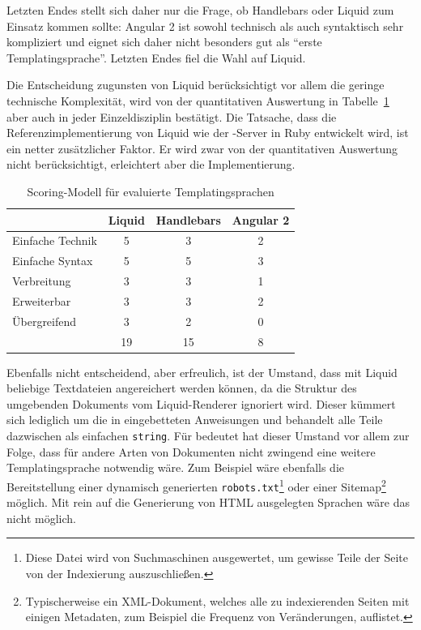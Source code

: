 Letzten Endes stellt sich daher nur die Frage, ob Handlebars oder Liquid zum Einsatz kommen sollte: Angular 2 ist sowohl technisch als auch syntaktisch sehr kompliziert und eignet sich daher nicht besonders gut als "`erste Templatingsprache"'. Letzten Endes fiel die Wahl auf Liquid.

Die Entscheidung zugunsten von Liquid berücksichtigt vor allem die geringe technische Komplexität, wird von der quantitativen Auswertung in Tabelle~\ref{tab:scoring-templating-language} aber auch in jeder Einzeldisziplin bestätigt. Die Tatsache, dass die Referenzimplementierung von Liquid wie der \idename{}-Server in Ruby entwickelt wird, ist ein netter zusätzlicher Faktor. Er wird zwar von der quantitativen Auswertung nicht berücksichtigt, erleichtert aber die Implementierung.

\begin{table}[h]
  \centering
  \begin{tabular}{ l c c c }
                      & Liquid   & Handlebars      & Angular 2   \\
    \hline
    Einfache Technik  & 5        & 3               & 2           \\
    Einfache Syntax   & 5        & 5               & 3           \\
    Verbreitung       & 3        & 3               & 1           \\
    Erweiterbar       & 3        & 3               & 2           \\
    Übergreifend      & 3        & 2               & 0           \\
    \hline \hline
                      & 19       & 15              & 8
  \end{tabular}
  \caption{Scoring-Modell für evaluierte Templatingsprachen}
  \label{tab:scoring-templating-language}
\end{table}

Ebenfalls nicht entscheidend, aber erfreulich, ist der Umstand, dass mit Liquid beliebige Textdateien angereichert werden können, da die Struktur des umgebenden Dokuments vom Liquid-Renderer ignoriert wird. Dieser kümmert sich lediglich um die in eingebetteten Anweisungen und behandelt alle Teile dazwischen als einfachen \texttt{string}. Für \idename{} bedeutet hat dieser Umstand vor allem zur Folge, dass für andere Arten von Dokumenten nicht zwingend eine weitere Templatingsprache notwendig wäre. Zum Beispiel wäre ebenfalls die Bereitstellung einer dynamisch generierten \texttt{robots.txt}\footnote{Diese Datei wird von Suchmaschinen ausgewertet, um gewisse Teile der Seite von der Indexierung auszuschließen.} oder einer Sitemap\footnote{Typischerweise ein XML-Dokument, welches alle zu indexierenden Seiten mit einigen Metadaten, zum Beispiel die Frequenz von Veränderungen, auflistet.} möglich. Mit rein auf die Generierung von HTML ausgelegten Sprachen wäre das nicht möglich.

